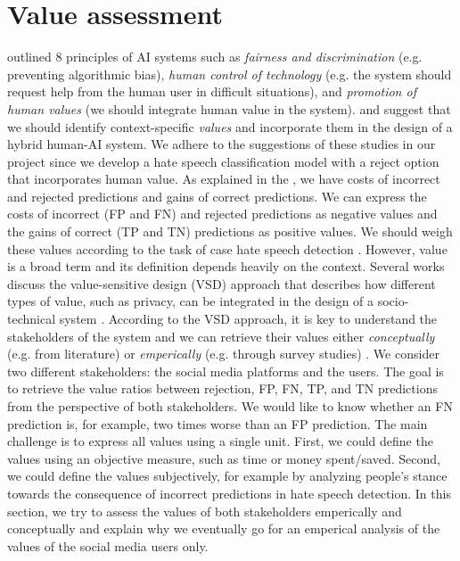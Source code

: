 \section{Value assessment}
\label{sec:related-work-value-assessment}
\citet{fjeld2020principled} outlined 8 principles of AI systems such as \emph{fairness and discrimination} (e.g. preventing algorithmic bias), \emph{human control of technology} (e.g. the system should request help from the human user in difficult situations), and \emph{promotion of human values} (we should integrate human value in the system).
%
\citet{sayin2021science} and \citet{casati2021value} suggest that we should identify context-specific \emph{values} and incorporate them in the design of a hybrid human-AI system.
%
We adhere to the suggestions of these studies in our project since we develop a hate speech classification model with a reject option that incorporates human value.
%
As explained in the , we have costs of incorrect and rejected predictions and gains of correct predictions.
%
We can express the costs of incorrect (FP and FN) and rejected predictions as negative values and the gains of correct (TP and TN) predictions as positive values.
%
We should weigh these values according to the task of case hate speech detection \citep{sayin2021science}.
%
However, value is a broad term and its definition depends heavily on the context.
%
Several works discuss the value-sensitive design (VSD) approach that describes how different types of value, such as privacy, can be integrated in the design of a socio-technical system \citep{zhu2018value, umbrello2021mapping}.
%
According to the VSD approach, it is key to understand the stakeholders of the system and we can retrieve their values either \emph{conceptually} (e.g. from literature) or \emph{emperically} (e.g. through survey studies) \citep{zhu2018value, umbrello2021mapping}.
%
We consider two different stakeholders: the social media platforms and the users.
%
The goal is to retrieve the value ratios between rejection, FP, FN, TP, and TN predictions from the perspective of both stakeholders.
%
We would like to know whether an FN prediction is, for example, two times worse than an FP prediction.
%
The main challenge is to express all values using a single unit.
%
First, we could define the values using an objective measure, such as time or money spent/saved.
%
Second, we could define the values subjectively, for example by analyzing people's stance towards the consequence of incorrect predictions in hate speech detection.
%
In this section, we try to assess the values of both stakeholders emperically and conceptually and explain why we eventually go for an emperical analysis of the values of the social media users only.
%


